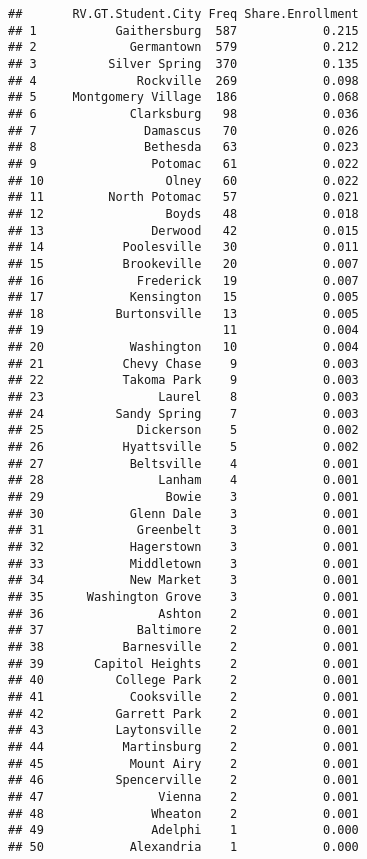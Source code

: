 \documentclass[]{article}
\begin{document}
\begin{verbatim}
##       RV.GT.Student.City Freq Share.Enrollment
## 1           Gaithersburg  587            0.215
## 2             Germantown  579            0.212
## 3          Silver Spring  370            0.135
## 4              Rockville  269            0.098
## 5     Montgomery Village  186            0.068
## 6             Clarksburg   98            0.036
## 7               Damascus   70            0.026
## 8               Bethesda   63            0.023
## 9                Potomac   61            0.022
## 10                 Olney   60            0.022
## 11         North Potomac   57            0.021
## 12                 Boyds   48            0.018
## 13               Derwood   42            0.015
## 14           Poolesville   30            0.011
## 15           Brookeville   20            0.007
## 16             Frederick   19            0.007
## 17            Kensington   15            0.005
## 18          Burtonsville   13            0.005
## 19                         11            0.004
## 20            Washington   10            0.004
## 21           Chevy Chase    9            0.003
## 22           Takoma Park    9            0.003
## 23                Laurel    8            0.003
## 24          Sandy Spring    7            0.003
## 25             Dickerson    5            0.002
## 26           Hyattsville    5            0.002
## 27            Beltsville    4            0.001
## 28                Lanham    4            0.001
## 29                 Bowie    3            0.001
## 30            Glenn Dale    3            0.001
## 31             Greenbelt    3            0.001
## 32            Hagerstown    3            0.001
## 33            Middletown    3            0.001
## 34            New Market    3            0.001
## 35      Washington Grove    3            0.001
## 36                Ashton    2            0.001
## 37             Baltimore    2            0.001
## 38           Barnesville    2            0.001
## 39       Capitol Heights    2            0.001
## 40          College Park    2            0.001
## 41            Cooksville    2            0.001
## 42          Garrett Park    2            0.001
## 43          Laytonsville    2            0.001
## 44           Martinsburg    2            0.001
## 45            Mount Airy    2            0.001
## 46          Spencerville    2            0.001
## 47                Vienna    2            0.001
## 48               Wheaton    2            0.001
## 49               Adelphi    1            0.000
## 50            Alexandria    1            0.000

\end{verbatim}
\end{document}
